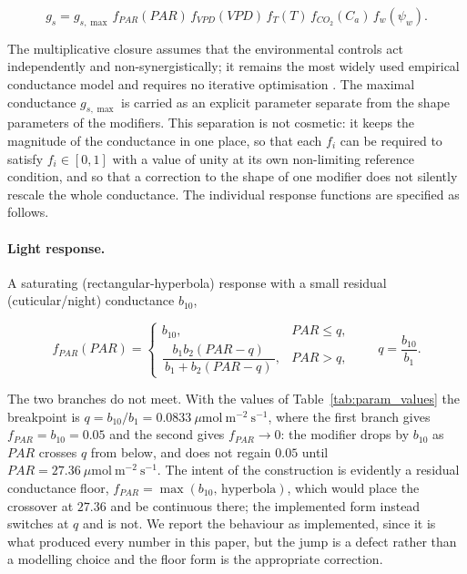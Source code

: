 \documentclass[a4paper,fleqn]{cas-sc}
\begin{document}
\begin{equation}
g_s =
g_{s,\max}\,
f_{\mathit{PAR}}(\mathit{PAR})\,
f_{\mathit{VPD}}(\mathit{VPD})\,
f_{T}(T)\,
f_{\mathit{CO_2}}(C_a)\,
f_{w}(\psi_w).
\label{eq:jarvis_general}
\end{equation}

The multiplicative closure assumes that the environmental controls act
independently and non-synergistically; it remains the most widely used
empirical conductance model and requires no iterative optimisation
\citep{Damour2010,Buckley2017}. The maximal conductance
$g_{s,\max}$ is carried as an explicit parameter separate from the shape
parameters of the modifiers. This separation is not cosmetic: it keeps the
magnitude of the conductance in one place, so that each $f_i$ can be
required to satisfy $f_i \in [0,1]$ with a value of unity at its own
non-limiting reference condition, and so that a correction to the shape of
one modifier does not silently rescale the whole conductance. The
individual response functions are specified as follows.

\paragraph{Light response.}
A saturating (rectangular-hyperbola) response with a small residual
(cuticular/night) conductance $b_{10}$,

\begin{equation}
f_{\mathit{PAR}}(\mathit{PAR}) =
\begin{cases}
b_{10}, & \mathit{PAR} \leq q, \\[4pt]
\dfrac{b_1 b_2 (\mathit{PAR}-q)}{\,b_1 + b_2 (\mathit{PAR}-q)\,}, & \mathit{PAR} > q,
\end{cases}
\qquad q=\frac{b_{10}}{b_1}.
\label{eq:jarvis_par}
\end{equation}

The two branches do not meet. With the values of
Table~\ref{tab:param_values} the breakpoint is
$q = b_{10}/b_1 = 0.0833\ \mu\mathrm{mol\ m^{-2}\ s^{-1}}$, where the first
branch gives $f_{\mathit{PAR}}=b_{10}=0.05$ and the second gives
$f_{\mathit{PAR}}\to 0$: the modifier drops by $b_{10}$ as $\mathit{PAR}$
crosses $q$ from below, and does not regain $0.05$ until
$\mathit{PAR} = 27.36\ \mu\mathrm{mol\ m^{-2}\ s^{-1}}$. The intent of the
construction is evidently a residual conductance floor,
$f_{\mathit{PAR}} = \max(b_{10},\,\text{hyperbola})$, which would place the
crossover at $27.36$ and be continuous there; the implemented form instead
switches at $q$ and is not. We report the behaviour as implemented, since it
is what produced every number in this paper, but the jump is a defect rather
than a modelling choice and the floor form is the appropriate correction.
\end{document}
